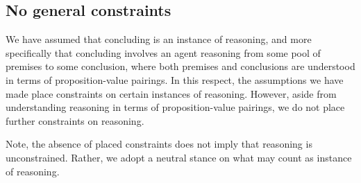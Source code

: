 \subsection{No general constraints}

\begin{note}
  We have assumed that concluding is an instance of reasoning, and more specifically that concluding involves an agent reasoning from some pool of premises to some conclusion, where both premises and conclusions are understood in terms of proposition-value pairings.
  In this respect, the assumptions we have made place constraints on certain instances of reasoning.
  However, aside from understanding reasoning in terms of proposition-value pairings, we do not place further constraints on reasoning.

  Note, the absence of placed constraints does not imply that reasoning is unconstrained.
  Rather, we adopt a neutral stance on what may count as instance of reasoning.
\end{note}


